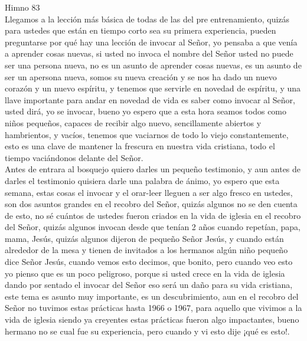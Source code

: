 \documentclass[12pt]{article}
\begin{document}
Himno 83\\

Llegamos a la lección más básica de todas de las del pre entrenamiento, quizás para ustedes que están en tiempo corto sea su primera experiencia, pueden preguntarse por qué hay una lección de invocar al Señor, yo pensaba a que venía a aprender cosas nuevas, si usted no invoca el nombre del Señor usted no puede ser una persona nueva, no es un asunto de aprender cosas nuevas, es un asunto de ser un apersona nueva, somos su nueva creación y se nos ha dado un nuevo corazón y un nuevo espíritu, y tenemos que servirle en novedad de espíritu, y una llave importante para andar en novedad de vida es saber como invocar al Señor, usted dirá, yo se invocar, bueno yo espero que a esta hora seamos todos como niños pequeños, capaces de recibir algo nuevo, sencillamente abiertos y hambrientos, y vacíos, tenemos que vaciarnos de todo lo viejo constantemente, esto es una clave de mantener la frescura en nuestra vida cristiana, todo el tiempo vaciándonos delante del Señor.\\

Antes de entrara al bosquejo quiero darles un pequeño testimonio, y aun antes de darles el testimonio quisiera darle una palabra de ánimo, yo espero que esta semana, estas cosas el invocar y el orar-leer lleguen a ser algo fresco en ustedes, son dos asuntos grandes en el recobro del Señor, quizás algunos no se den cuenta de esto, no sé cuántos de ustedes fueron criados en la vida de iglesia en el recobro del Señor, quizás algunos invocan desde que tenían 2 años cuando repetían, papa, mama, Jesús, quizás algunos dijeron de pequeño Señor Jesús, y cuando están alrededor de la mesa y tienen de invitados a los hermanos algún niño pequeño dice Señor Jesús, cuando vemos esto decimos, que bonito, pero cuando veo esto yo pienso que es un poco peligroso, porque si usted crece en la vida de iglesia dando por sentado el invocar del Señor eso será un daño para su vida cristiana, este tema es asunto muy importante, es un descubrimiento, aun en el recobro del Señor no tuvimos estas prácticas hasta 1966 o 1967,  para aquello que vivimos a la vida de iglesia siendo ya creyentes estas prácticas fueron algo impactantes, bueno hermano no se cual fue su experiencia, pero cuando  y vi esto dije ¡qué es esto!.\\
\end{document}
